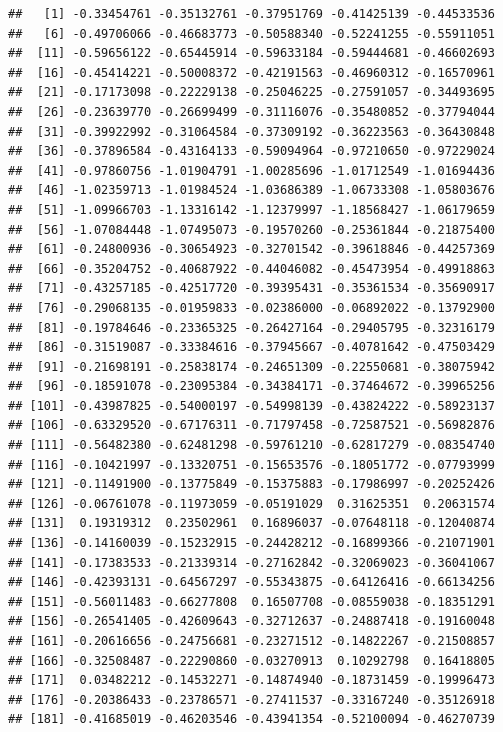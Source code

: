 \documentclass[]{gitbook}
\begin{document}
\begin{verbatim}
##   [1] -0.33454761 -0.35132761 -0.37951769 -0.41425139 -0.44533536
##   [6] -0.49706066 -0.46683773 -0.50588340 -0.52241255 -0.55911051
##  [11] -0.59656122 -0.65445914 -0.59633184 -0.59444681 -0.46602693
##  [16] -0.45414221 -0.50008372 -0.42191563 -0.46960312 -0.16570961
##  [21] -0.17173098 -0.22229138 -0.25046225 -0.27591057 -0.34493695
##  [26] -0.23639770 -0.26699499 -0.31116076 -0.35480852 -0.37794044
##  [31] -0.39922992 -0.31064584 -0.37309192 -0.36223563 -0.36430848
##  [36] -0.37896584 -0.43164133 -0.59094964 -0.97210650 -0.97229024
##  [41] -0.97860756 -1.01904791 -1.00285696 -1.01712549 -1.01694436
##  [46] -1.02359713 -1.01984524 -1.03686389 -1.06733308 -1.05803676
##  [51] -1.09966703 -1.13316142 -1.12379997 -1.18568427 -1.06179659
##  [56] -1.07084448 -1.07495073 -0.19570260 -0.25361844 -0.21875400
##  [61] -0.24800936 -0.30654923 -0.32701542 -0.39618846 -0.44257369
##  [66] -0.35204752 -0.40687922 -0.44046082 -0.45473954 -0.49918863
##  [71] -0.43257185 -0.42517720 -0.39395431 -0.35361534 -0.35690917
##  [76] -0.29068135 -0.01959833 -0.02386000 -0.06892022 -0.13792900
##  [81] -0.19784646 -0.23365325 -0.26427164 -0.29405795 -0.32316179
##  [86] -0.31519087 -0.33384616 -0.37945667 -0.40781642 -0.47503429
##  [91] -0.21698191 -0.25838174 -0.24651309 -0.22550681 -0.38075942
##  [96] -0.18591078 -0.23095384 -0.34384171 -0.37464672 -0.39965256
## [101] -0.43987825 -0.54000197 -0.54998139 -0.43824222 -0.58923137
## [106] -0.63329520 -0.67176311 -0.71797458 -0.72587521 -0.56982876
## [111] -0.56482380 -0.62481298 -0.59761210 -0.62817279 -0.08354740
## [116] -0.10421997 -0.13320751 -0.15653576 -0.18051772 -0.07793999
## [121] -0.11491900 -0.13775849 -0.15375883 -0.17986997 -0.20252426
## [126] -0.06761078 -0.11973059 -0.05191029  0.31625351  0.20631574
## [131]  0.19319312  0.23502961  0.16896037 -0.07648118 -0.12040874
## [136] -0.14160039 -0.15232915 -0.24428212 -0.16899366 -0.21071901
## [141] -0.17383533 -0.21339314 -0.27162842 -0.32069023 -0.36041067
## [146] -0.42393131 -0.64567297 -0.55343875 -0.64126416 -0.66134256
## [151] -0.56011483 -0.66277808  0.16507708 -0.08559038 -0.18351291
## [156] -0.26541405 -0.42609643 -0.32712637 -0.24887418 -0.19160048
## [161] -0.20616656 -0.24756681 -0.23271512 -0.14822267 -0.21508857
## [166] -0.32508487 -0.22290860 -0.03270913  0.10292798  0.16418805
## [171]  0.03482212 -0.14532271 -0.14874940 -0.18731459 -0.19996473
## [176] -0.20386433 -0.23786571 -0.27411537 -0.33167240 -0.35126918
## [181] -0.41685019 -0.46203546 -0.43941354 -0.52100094 -0.46270739

\end{verbatim}
\end{document}
